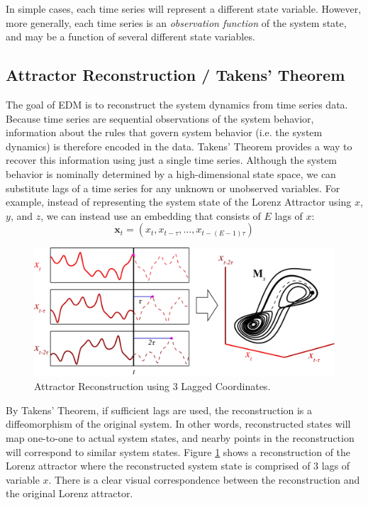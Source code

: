 \documentclass[article]{jss}
\begin{document}
In simple cases, each time series will represent a different state variable. However, more generally, each time series is an \emph{observation function} of the system state, and may be a function of several different state variables. 

\subsection{Attractor Reconstruction / Takens' Theorem}\label{sec:attractor-reconstruction}

The goal of EDM is to reconstruct the system dynamics from time series data. Because time series are sequential observations of the system behavior, information about the rules that govern system behavior (i.e. the system dynamics) is therefore encoded in the data. Takens' Theorem \cite{Takens_1981} provides a way to recover this information using just a single time series. Although the system behavior is nominally determined by a high-dimensional state space, we can substitute lags of a time series for any unknown or unobserved variables. For example, instead of representing the system state of the Lorenz Attractor using $x$, $y$, and $z$, we can instead use an embedding that consists of $E$ lags of $x$:
\begin{equation}
\mathbf{x}_t = \left( x_t, x_{t-\tau}, \dots, x_{t-(E-1)\tau} \right)
\end{equation}

\begin{figure}[t!]
\centering
\includegraphics{figure_2}
\caption{\label{fig:attractor-reconstruction} Attractor Reconstruction using 3 Lagged Coordinates.}
\end{figure}

By Takens' Theorem, if sufficient lags are used, the reconstruction is a diffeomorphism of the original system. In other words, reconstructed states will map one-to-one to actual system states, and nearby points in the reconstruction will correspond to similar system states. Figure \ref{fig:attractor-reconstruction} shows a reconstruction of the Lorenz attractor where the reconstructed system state is comprised of 3 lags of variable $x$. There is a clear visual correspondence between the reconstruction and the original Lorenz attractor.
\end{document}
